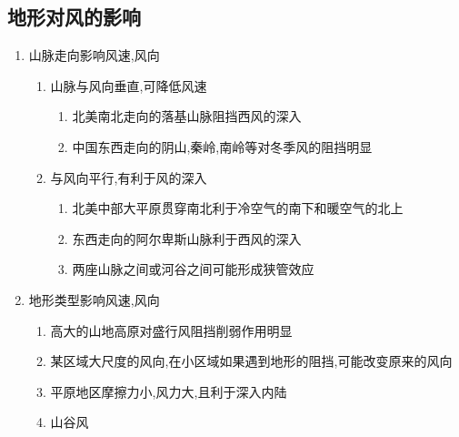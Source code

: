 \documentclass[a4paper]{article}
\begin{document}
    \subsection{地形对风的影响}
    \begin{enumerate}
        \item 山脉走向影响风速,风向
        \begin{enumerate}
            \item 山脉与风向垂直,可降低风速
            \begin{enumerate}
                \item 北美南北走向的落基山脉阻挡西风的深入
                \item 中国东西走向的阴山,秦岭,南岭等对冬季风的阻挡明显
            \end{enumerate}
            \item 与风向平行,有利于风的深入
            \begin{enumerate}
                \item 北美中部大平原贯穿南北利于冷空气的南下和暖空气的北上
                \item 东西走向的阿尔卑斯山脉利于西风的深入
                \item 两座山脉之间或河谷之间可能形成狭管效应
            \end{enumerate}
        \end{enumerate}
        \item 地形类型影响风速,风向
        \begin{enumerate}
            \item 高大的山地高原对盛行风阻挡削弱作用明显
            \item 某区域大尺度的风向,在小区域如果遇到地形的阻挡,可能改变原来的风向
            \item 平原地区摩擦力小,风力大,且利于深入内陆
            \item 山谷风
        \end{enumerate}
    \end{enumerate}
\end{document}
